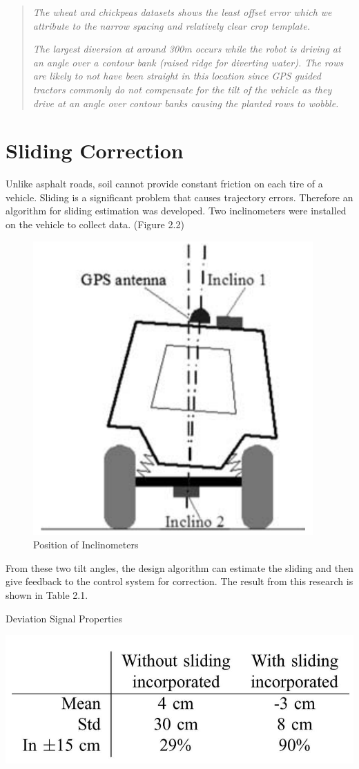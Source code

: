 \begin{quote}
\textit{The wheat and chickpeas datasets shows the least offset error which we attribute to the narrow spacing and relatively clear crop template.}

\textit{The largest diversion at around 300m occurs while the robot is driving at an angle over a contour bank (raised ridge for diverting water). The rows are likely to not have been straight in this location since GPS guided tractors commonly do not compensate for the tilt of the vehicle as they drive at an angle over contour banks causing the planted rows to wobble.}
\end{quote}

\section{Sliding Correction}
Unlike asphalt roads, soil cannot provide constant friction on each tire of a vehicle. Sliding is a significant problem that causes trajectory errors. Therefore an algorithm for sliding estimation was developed. Two inclinometers were installed on the vehicle to collect data. (Figure 2.2) 
\begin{figure}[ht!]
\begin{center}
\includegraphics[scale = 0.5]{pics/slidingcorrection.png}
\caption{Position of Inclinometers}
\end{center}
\end{figure}
From these two tilt angles, the design algorithm can estimate the sliding and then give feedback to the control system for correction. The result from this research is shown in Table 2.1. \cite{lenain2006high}
\begin{table}[ht!]
\begin{center}
\caption{Deviation Signal Properties}
\includegraphics[scale = 0.5]{pics/slidingresult.jpg}
\end{center}
\end{table}